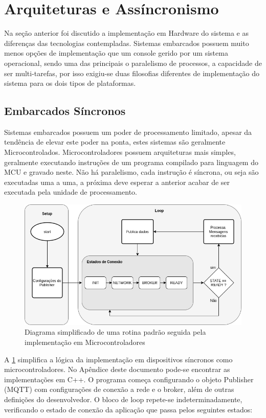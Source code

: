 \section{Arquiteturas e Assíncronismo}
\label{section:arquitetura}

Na seção anterior foi discutido a implementação em Hardware do sistema e as diferenças das tecnologias contempladas. Sistemas embarcados 
possuem muito menos opções de implementação que um console gerido por um sistema operacional, sendo uma das principais o paralelismo de processos, a capacidade de ser multi-tarefas, por isso exigiu-se duas filosofias diferentes de implementação do sistema para os dois tipos de plataformas.

\subsection{Embarcados Síncronos}
\label{subsection:embarcados_sinc}

Sistemas embarcados possuem um poder de processamento limitado, apesar da tendência de elevar este poder na ponta, estes sistemas são geralmente Microcontrolados. Microcontroladores possuem arquiteturas mais simples, geralmente executando instruções de um programa compilado para linguagem do MCU e gravado neste. Não há paralelismo, cada instrução é síncrona, ou seja são executadas uma a uma, a próxima deve esperar a anterior acabar de ser executada pela unidade de processamento.

\begin{figure}[h!]
\centering
\includegraphics[width=12cm]{./02_Capitulos/02_Cap3/figures/sinc_implementation}
\caption{Diagrama simplificado de uma rotina padrão seguida pela implementação em Microcontroladores}
\label{fig:sinc-implementation}
\end{figure}

A \ref{fig:sinc-implementation} simplifica a lógica da implementação em dispositivos síncronos como microcontroladores. No Apêndice deste documento pode-se encontrar as implementações em C++. O programa começa configurando o objeto Publisher (MQTT) com configurações de conexão a rede e o broker, além de outras definições do desenvolvedor. O bloco de loop repete-se indeterminadamente, verificando o estado de conexão da aplicação que passa pelos seguintes estados:


